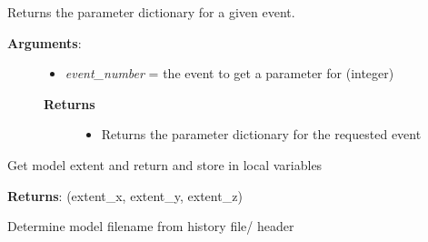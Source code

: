\documentclass[a4paper,10pt,english]{sphinxmanual}
\begin{document}
\begin{fulllineitems}
\begin{fulllineitems}
\begin{description}
\begin{description}
\begin{itemize}
\end{itemize}

\end{description}

\end{description}

\end{fulllineitems}


\begin{fulllineitems}
\label{pynoddy:pynoddy.history.NoddyHistory.get_event_params}
Returns the parameter dictionary for a given event.
\begin{description}
\item[{\textbf{Arguments}:}] \leavevmode\begin{itemize}
\item {} 
\emph{event\_number} = the event to get a parameter for (integer)

\end{itemize}
\begin{description}
\item[{\textbf{Returns}}] \leavevmode\begin{itemize}
\item {} 
Returns the parameter dictionary for the requested event

\end{itemize}

\end{description}

\end{description}

\end{fulllineitems}


\begin{fulllineitems}
\label{pynoddy:pynoddy.history.NoddyHistory.get_extent}
Get model extent and return and store in local variables

\textbf{Returns}: (extent\_x, extent\_y, extent\_z)

\end{fulllineitems}


\begin{fulllineitems}
\label{pynoddy:pynoddy.history.NoddyHistory.get_filename}
Determine model filename from history file/ header


\end{fulllineitems}
\end{fulllineitems}
\end{document}
